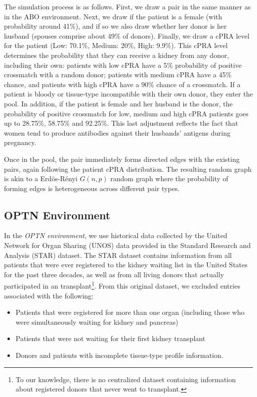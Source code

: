The simulation process is as follows. First, we draw a pair in the same manner as in the ABO environment. Next, we draw if the patient is a female (with probability around 41\%), and if so we also draw whether her donor is her husband (spouses comprise about 49\% of donors). Finally, we draw a  cPRA level for the patient (Low: 70.1\%, Medium: 20\%, High: 9.9\%). This cPRA level determines the probability that they can receive a kidney from any donor, including their own: patients with low cPRA have a 5\% probability of positive crossmatch with a random donor; patients with medium cPRA have a 45\% chance, and patients with high cPRA have a 90\% chance of a crossmatch. If a patient is bloody or tissue-type incompatible with their own donor, they enter the pool. In addition, if the patient is female and her husband is the donor, the probability of positive crossmatch for low, medium and high cPRA patients goes up to 28.75\%, 58.75\% and 92.25\%. This last adjustment reflects the fact that women tend to produce antibodies against their husbands' antigens during pregnancy.

Once in the pool, the pair immediately forms directed edges with the existing pairs, again following the patient cPRA distribution. The resulting random graph is akin to a Erd\"{o}s-R\'{e}nyi $G(n,p)$ random graph where the probability of forming edges is heterogeneous across different pair types.

\subsection{OPTN Environment}

In the \emph{OPTN environment}, we use historical data collected by the United Network for Organ Sharing (UNOS) data provided in the Standard Research and Analysis (STAR) dataset. The STAR dataset contains information from all patients that were ever registered to the kidney waiting list in the United States for the past three decades, as well as from all living donors that actually participated in an transplant\footnote{To our knowledge, there is no centralized dataset containing information about registered donors that never went to transplant.}. From this original dataset, we excluded entries associated with the following:

\begin{itemize} 
  \item Patients that were registered for more than one organ (including those who were simultaneously waiting for kidney and pancreas)
  \item Patients that were not waiting for their first kidney transplant
  \item Donors and patients with incomplete tissue-type profile information.
\end{itemize}
  
